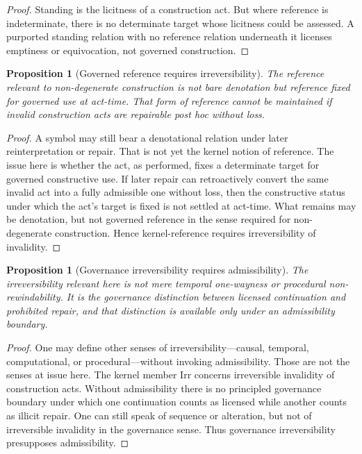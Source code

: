 \documentclass[11pt]{article}
\newtheorem{proposition}[theorem]{Proposition}
\theoremstyle{definition}
\theoremstyle{remark}
\newcommand{\Irr}{\mathrm{Irr}}
\begin{document}
\begin{proof}
Standing is the licitness of a construction act. But where reference is indeterminate, there is no determinate target whose licitness could be assessed. A purported standing relation with no reference relation underneath it licenses emptiness or equivocation, not governed construction.
\end{proof}

\begin{proposition}[Governed reference requires irreversibility]\label{prop:reference-requires-irreversibility}
The reference relevant to non-degenerate construction is not bare denotation but reference fixed for governed use at act-time. That form of reference cannot be maintained if invalid construction acts are repairable post hoc without loss.
\end{proposition}

\begin{proof}
A symbol may still bear a denotational relation under later reinterpretation or repair. That is not yet the kernel notion of reference. The issue here is whether the act, as performed, fixes a determinate target for governed constructive use. If later repair can retroactively convert the same invalid act into a fully admissible one without loss, then the constructive status under which the act's target is fixed is not settled at act-time. What remains may be denotation, but not governed reference in the sense required for non-degenerate construction. Hence kernel-reference requires irreversibility of invalidity.
\end{proof}

\begin{proposition}[Governance irreversibility requires admissibility]\label{prop:irreversibility-requires-admissibility}
The irreversibility relevant here is not mere temporal one-wayness or procedural non-rewindability. It is the governance distinction between licensed continuation and prohibited repair, and that distinction is available only under an admissibility boundary.
\end{proposition}

\begin{proof}
One may define other senses of irreversibility---causal, temporal, computational, or procedural---without invoking admissibility. Those are not the senses at issue here. The kernel member $\Irr$ concerns irreversible invalidity of construction acts. Without admissibility there is no principled governance boundary under which one continuation counts as licensed while another counts as illicit repair. One can still speak of sequence or alteration, but not of irreversible invalidity in the governance sense. Thus governance irreversibility presupposes admissibility.
\end{proof}
\end{document}
